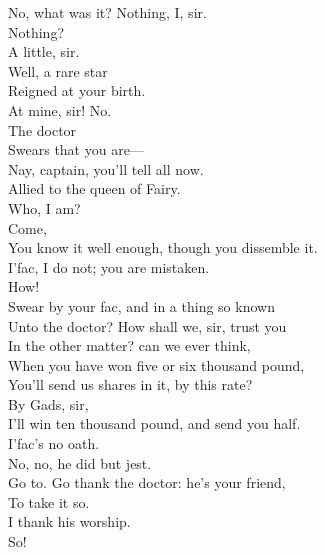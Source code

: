 \documentclass[a4paper,oneside,12pt]{memoir}
\begin{document}
\begin{drama*}
\dapperspeaks {} No, what was it? Nothing, I, sir.\\
\facespeaks Nothing?\\
\dapperspeaks {} A little, sir.\\
\facespeaks {} Well, a rare star\\
Reigned at your birth.\\
\dapperspeaks {} At mine, sir! No.\\
\facespeaks {} The doctor\\
Swears that you are---\\
\subtlespeaks {} Nay, captain, you'll tell all now.\\
\facespeaks Allied to the queen of Fairy.\\
\dapperspeaks {} Who, I am?\\
\facespeaks {} Come,\\
You know it well enough, though you dissemble it.\\
\dapperspeaks I'fac, I do not; you are mistaken.\\
\facespeaks {} How!\\
Swear by your fac, and in a thing so known\\
Unto the doctor? How shall we, sir, trust you\\
In the other matter? can we ever think,\\
When you have won five or six thousand pound,\\
You'll send us shares in it, by this rate?\\
\dapperspeaks {} By Gads, sir,\\
I'll win ten thousand pound, and send you half.\\
I'fac's no oath.\\
\subtlespeaks {} No, no, he did but jest.\\
\facespeaks Go to. Go thank the doctor: he's your friend,\\
To take it so.\\
\dapperspeaks {} I thank his worship.\\
\facespeaks {} So!\\

\end{drama*}
\end{document}
